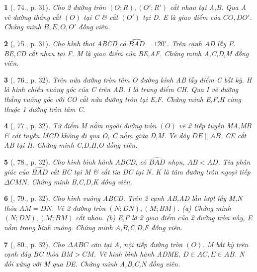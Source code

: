 \documentclass{article}
\newtheorem{baitoan}{}
\begin{document}
\begin{baitoan}[\cite{Thu_Chung_Viet_Minh_circ}, 74., p. 31]
	Cho 2 đường tròn $(O;R),(O';R')$ cắt nhau tại A,B. Qua A vẽ đường thẳng cắt $(O)$ tại C \& cắt $(O')$ tại D. E là giao điểm của $CO,DO'$. Chứng minh $B,E,O,O'$ đồng viên.
\end{baitoan}

\begin{baitoan}[\cite{Thu_Chung_Viet_Minh_circ}, 75., p. 31]
	Cho hình thoi ABCD có $\widehat{BAD} = 120^\circ$. Trên cạnh AD lấy E. BE,CD cắt nhau tại F. M là giao điểm của BE,AF. Chứng minh A,C,D,M đồng viên.
\end{baitoan}

\begin{baitoan}[\cite{Thu_Chung_Viet_Minh_circ}, 76., p. 32]
	Trên nửa đường tròn tâm O đường kính AB lấy điểm C bất kỳ. H là hình chiếu vuông góc của C trên AB. I là trung điểm CH. Qua I vẽ đường thẳng vuông góc với CO cắt nửa đường tròn tại E,F. Chứng minh E,F,H cùng thuộc 1 đường tròn tâm C.
\end{baitoan}

\begin{baitoan}[\cite{Thu_Chung_Viet_Minh_circ}, 77., p. 32]
	Từ điểm M nằm ngoài đường tròn $(O)$ vẽ 2 tiếp tuyến MA,MB \& cát tuyến MCD không đi qua O, C nằm giữa D,M. Vẽ dây $DE\parallel AB$. CE cắt AB tại H. Chứng minh C,D,H,O đồng viên.
\end{baitoan}

\begin{baitoan}[\cite{Thu_Chung_Viet_Minh_circ}, 78., p. 32]
	Cho hình bình hành ABCD, có $\widehat{BAD}$ nhọn, $AB < AD$. Tia phân giác của $\widehat{BAD}$ cắt BC tại M \& cắt tia DC tại N. K là tâm đường tròn ngoại tiếp $\Delta CMN$. Chứng minh B,C,D,K đồng viên.
\end{baitoan}

\begin{baitoan}[\cite{Thu_Chung_Viet_Minh_circ}, 79., p. 32]
	Cho hình vuông ABCD. Trên 2 cạnh AB,AD lần lượt lấy M,N thỏa $AM = DN$. Vẽ 2 đường tròn $(N;DN),(M;BM)$. (a) Chứng minh $(N;DN),(M;BM)$ cắt nhau. (b) E,F là 2 giao điểm của 2 đường tròn này, E nằm trong hình vuông. Chứng minh A,B,C,D,F đồng viên.
\end{baitoan}

\begin{baitoan}[\cite{Thu_Chung_Viet_Minh_circ}, 80., p. 32]
	Cho $\Delta ABC$ cân tại A, nội tiếp đường tròn $(O)$. M bất kỳ trên cạnh đáy BC thỏa $BM > CM$. Vẽ hình bình hành ADME, $D\in AC,E\in AB$. N đối xứng với M qua DE. Chứng minh A,B,C,N đồng viên.
\end{baitoan}
\end{document}
